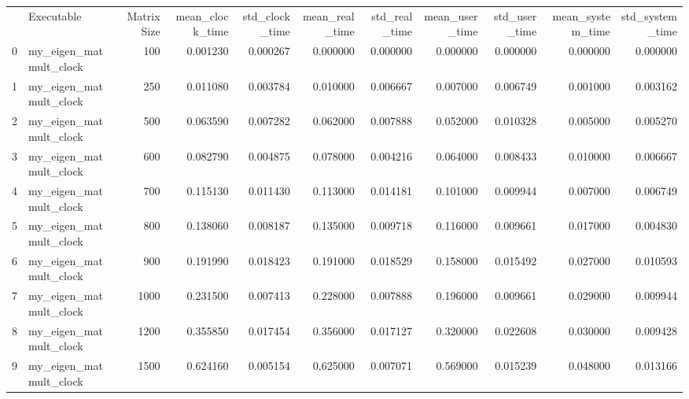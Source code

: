 \begin{tabular}{llrrrrrrrrr}
 & Executable & Matrix Size & mean_clock_time & std_clock_time & mean_real_time & std_real_time & mean_user_time & std_user_time & mean_system_time & std_system_time \\
0 & my_eigen_matmult_clock & 100 & 0.001230 & 0.000267 & 0.000000 & 0.000000 & 0.000000 & 0.000000 & 0.000000 & 0.000000 \\
1 & my_eigen_matmult_clock & 250 & 0.011080 & 0.003784 & 0.010000 & 0.006667 & 0.007000 & 0.006749 & 0.001000 & 0.003162 \\
2 & my_eigen_matmult_clock & 500 & 0.063590 & 0.007282 & 0.062000 & 0.007888 & 0.052000 & 0.010328 & 0.005000 & 0.005270 \\
3 & my_eigen_matmult_clock & 600 & 0.082790 & 0.004875 & 0.078000 & 0.004216 & 0.064000 & 0.008433 & 0.010000 & 0.006667 \\
4 & my_eigen_matmult_clock & 700 & 0.115130 & 0.011430 & 0.113000 & 0.014181 & 0.101000 & 0.009944 & 0.007000 & 0.006749 \\
5 & my_eigen_matmult_clock & 800 & 0.138060 & 0.008187 & 0.135000 & 0.009718 & 0.116000 & 0.009661 & 0.017000 & 0.004830 \\
6 & my_eigen_matmult_clock & 900 & 0.191990 & 0.018423 & 0.191000 & 0.018529 & 0.158000 & 0.015492 & 0.027000 & 0.010593 \\
7 & my_eigen_matmult_clock & 1000 & 0.231500 & 0.007413 & 0.228000 & 0.007888 & 0.196000 & 0.009661 & 0.029000 & 0.009944 \\
8 & my_eigen_matmult_clock & 1200 & 0.355850 & 0.017454 & 0.356000 & 0.017127 & 0.320000 & 0.022608 & 0.030000 & 0.009428 \\
9 & my_eigen_matmult_clock & 1500 & 0.624160 & 0.005154 & 0.625000 & 0.007071 & 0.569000 & 0.015239 & 0.048000 & 0.013166 \\
\end{tabular}
